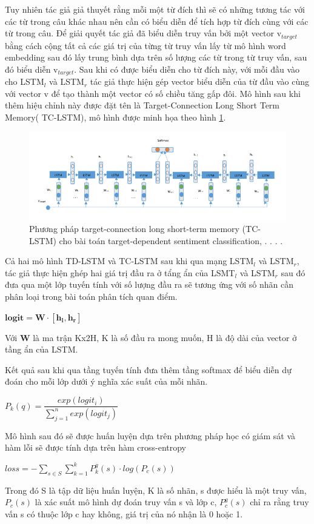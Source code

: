 \documentclass[fontsize=12pt]{scrartcl}
\begin{document}
\par
Tuy nhiên tác giả giả thuyết rằng mỗi một từ đích thì sẽ có những tương tác với các từ trong câu khác nhau nên cần có biểu diễn để tích hợp từ đích cùng  với các từ trong câu. Để giải quyết tác giả đã biểu diễn truy vấn bởi một vector v$_{target}$ bằng cách cộng tất cả các giá trị của từng từ truy vấn lấy từ mô hình word embedding sau đó lấy trung bình dựa trên số lượng các từ trong từ truy vấn, sau đó biểu diễn v$_{target}$. Sau khi có được biểu diễn cho từ đích này, với mỗi đầu vào cho LSTM$_{l}$ và LSTM$_{r}$ tác giả thực hiện gép vector biểu diễn của từ đầu vào cùng với vector v để tạo thành một vector có số chiều tăng gấp đôi. Mô hình sau khi thêm hiệu chỉnh này được đặt tên là Target-Connection Long Short Term Memory( TC-LSTM), mô hình được minh họa theo hình \ref{img_tc_lstm}.
\begin{figure}
     \includegraphics[width=\textwidth]{img/tc_lstm}
      \caption{Phương pháp target-connection long short-term memory (TC-LSTM) cho bài toán  target-dependent sentiment classification, . . . . }
       \label{img_tc_lstm}
\end{figure}
\par
Cả hai mô hình TD-LSTM và TC-LSTM sau khi qua mạng LSTM$_{l}$ và LSTM$_{r}$, tác giả thực hiện ghép hai giá trị đầu ra ở tẩng ẩn của LSMT$_{l}$ và LSTM$_{r}$ sau đó đưa qua một lớp tuyến tính với số lượng đầu ra sẽ tương ứng với số nhãn cần phân loại trong bài toán phân tích quan điểm.
\begin{center}
$\boldsymbol{logit} = \boldsymbol{W}\cdot[\boldsymbol{h_{l}},\boldsymbol{h_{r}}]$\\
\end{center}

Với $\boldsymbol{W}$ là ma trận Kx2H, K là số đầu ra mong muốn, H là độ dài của vector ở tầng ẩn của LSTM.
\par
Kết quả sau khi qua tầng tuyến tính đưa thêm tầng softmax để biểu diễn dự đoán cho mỗi lớp dưới ý nghĩa xác suất của mỗi nhãn.
\begin{center}
$P_k(q) = \dfrac{exp(logit_i)}{\sum_{j=1}^n exp(logit_j)}$
\end{center}
Mô hình sau đó sẽ được huấn luyện dựa trên phương pháp học có giám sát và hàm lỗi sẽ được tính dựa trên hàm cross-entropy
\begin{center}
$loss = - \sum_{s\in S} \sum_{k=1}^k P_k^g(s)\cdot log(P_c(s))$
\end{center}
Trong đó S là tập dữ liệu huấn luyện, K là số nhãn, s được hiểu là một truy vấn, $P_c(s)$ là xác suất mô hình dự đoán truy vấn s và lớp c, $P_c^g(s)$ chỉ ra rằng truy vấn s có thuộc lớp c hay không, giá trị của nó nhận là 0 hoặc 1.
\end{document}
